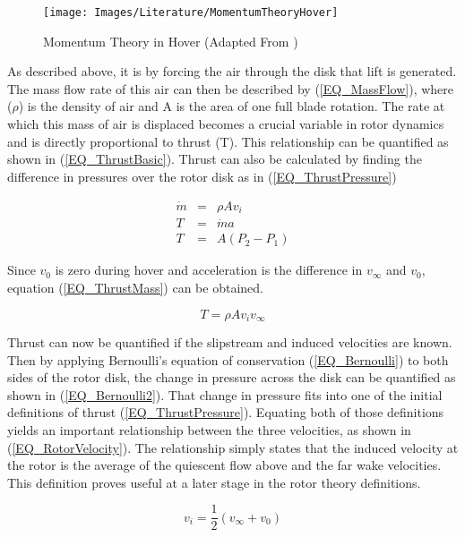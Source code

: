 	\begin{figure}[h]
	\centering
	\texttt{[image: Images/Literature/MomentumTheoryHover]}			%
	\caption{Momentum Theory in Hover (Adapted From \cite{Leishman})}
	\label{IM_MomentumTheoryHover}
	\end{figure}
	
	As described above, it is by forcing the air through the disk that lift is generated. The mass flow rate of this air can then be described by (\ref{EQ_MassFlow}), where ($\rho$) is the density of air and A is the area of one full blade rotation. The rate at which this mass of air is displaced becomes a crucial variable in rotor dynamics and is directly proportional to thrust (T). This relationship can be quantified as shown in (\ref{EQ_ThrustBasic}). Thrust can also be calculated by finding the difference in pressures over the rotor disk as in (\ref{EQ_ThrustPressure})
	
	\begin{eqnarray}
	\dot{m} &=& \rho A v_{i}\label{EQ_MassFlow}\\
	T &=& \dot{m}a\label{EQ_ThrustBasic}\\
	T &=& A(P_2 - P_1)\label{EQ_ThrustPressure}
	\end{eqnarray}
	
	Since $v_0$ is zero during hover and acceleration is the difference in $v_\infty$ and $v_0$, equation (\ref{EQ_ThrustMass}) can be obtained.
	
	\begin{equation}
	\label{EQ_ThrustMass}
	T = \rho A v_{i} v_\infty
	\end{equation}
	
	Thrust can now be quantified if the slipstream and induced velocities are known. 
	Then by applying Bernoulli's equation of conservation (\ref{EQ_Bernoulli}) to both sides of the rotor disk, the change in pressure across the disk can be quantified as shown in (\ref{EQ_Bernoulli2}).
	That change in pressure fits into one of the initial definitions of thrust (\ref{EQ_ThrustPressure}). Equating both of those definitions yields an important relationship between the three velocities, as shown in (\ref{EQ_RotorVelocity}). The relationship simply states that the induced velocity at the rotor is the average of the quiescent flow above and the far wake velocities. This definition proves useful at a later stage in the rotor theory definitions. 
	
	\begin{equation}
	\label{EQ_RotorVelocity}
	v_i = \frac{1}{2} (v_\infty + v_0)
	\end{equation}

